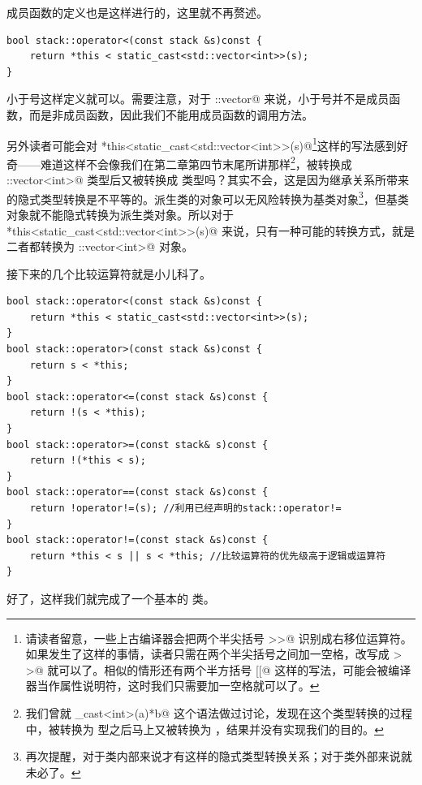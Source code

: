 \lstinline@swap@ 成员函数的定义也是这样进行的，这里就不再赘述。\par
\begin{lstlisting}
bool stack::operator<(const stack &s)const {
    return *this < static_cast<std::vector<int>>(s);
}
\end{lstlisting}
小于号这样定义就可以。需要注意，对于 \lstinline@std::vector@ 来说，小于号并不是成员函数，而是非成员函数，因此我们不能用成员函数的调用方法。\par
另外读者可能会对 \lstinline@*this<static_cast<std::vector<int>>(s)@\footnote{请读者留意，一些上古编译器会把两个半尖括号 \lstinline@>>@ 识别成右移位运算符。如果发生了这样的事情，读者只需在两个半尖括号之间加一空格，改写成 \lstinline@> >@ 就可以了。相似的情形还有两个半方括号 \lstinline@[[@ 这样的写法，可能会被编译器当作属性说明符，这时我们只需要加一空格就可以了。}这样的写法感到好奇——难道这样不会像我们在第二章第四节末尾所讲那样\footnote{我们曾就 \lstinline@static_cast<int>(a)*b@ 这个语法做过讨论，发现在这个类型转换的过程中，\lstinline@a@ 被转换为 \lstinline@int@ 型之后马上又被转换为 \lstinline@double@，结果并没有实现我们的目的。}，\lstinline@s@ 被转换成 \lstinline@std::vector<int>@ 类型后又被转换成 \lstinline@stack@ 类型吗？其实不会，这是因为继承关系所带来的隐式类型转换是不平等的。派生类的对象可以无风险转换为基类对象\footnote{再次提醒，对于类内部来说才有这样的隐式类型转换关系；对于类外部来说就未必了。}，但基类对象就不能隐式转换为派生类对象。所以对于 \lstinline@*this<static_cast<std::vector<int>>(s)@ 来说，只有一种可能的转换方式，就是二者都转换为 \lstinline@std::vector<int>@ 对象。\par
接下来的几个比较运算符就是小儿科了。
\begin{lstlisting}
bool stack::operator<(const stack &s)const {
    return *this < static_cast<std::vector<int>>(s);
}
bool stack::operator>(const stack &s)const {
    return s < *this;
}
bool stack::operator<=(const stack &s)const {
    return !(s < *this);
}
bool stack::operator>=(const stack& s)const {
    return !(*this < s);
}
bool stack::operator==(const stack &s)const {
    return !operator!=(s); //利用已经声明的stack::operator!=
}
bool stack::operator!=(const stack &s)const {
    return *this < s || s < *this; //比较运算符的优先级高于逻辑或运算符
}
\end{lstlisting}
好了，这样我们就完成了一个基本的 \lstinline@stack@ 类。\par
